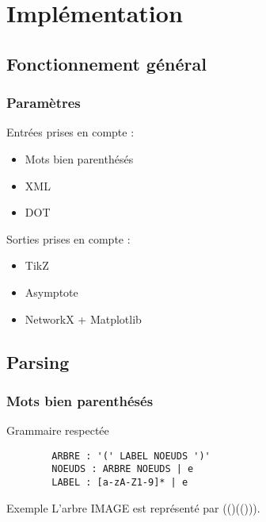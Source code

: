 \section{Implémentation}

\subsection{Fonctionnement général}

\begin{frame}
    \frametitle{Paramètres}
    Entrées prises en compte :
    \begin{itemize}
        \item Mots bien parenthésés
        \item XML
        \item DOT %
    \end{itemize}
    Sorties prises en compte :
    \begin{itemize}
        \item TikZ %
        \item Asymptote %
        \item NetworkX + Matplotlib %
    \end{itemize}
\end{frame}

\subsection{Parsing}

\begin{frame}[fragile]
    \frametitle{Mots bien parenthésés}
    \begin{block}{Grammaire respectée}
    \begin{verbatim}
        ARBRE : '(' LABEL NOEUDS ')'
        NOEUDS : ARBRE NOEUDS | e
        LABEL : [a-zA-Z1-9]* | e
    \end{verbatim}
    \end{block}
    \begin{exampleblock}{Exemple}
    L'arbre IMAGE est représenté par (()(())).
    \end{exampleblock}
\end{frame}

